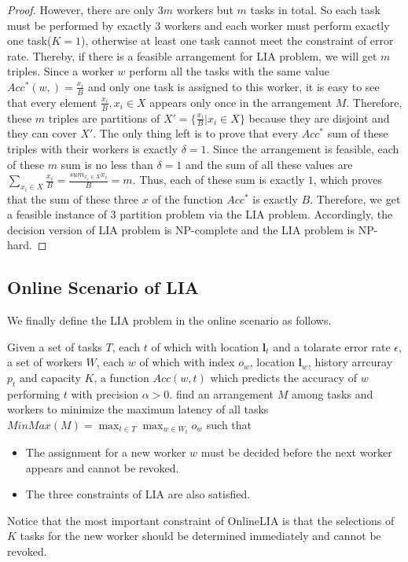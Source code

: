\begin{proof}
However, there are only $3m$ workers but $m$ tasks in total.
So each task must be performed by exactly 3 workers and each worker must perform exactly one task($K = 1$), 
otherwise at least one task cannot meet the constraint of error rate.
Thereby, if there is a feasible arrangement for LIA problem, we will get $m$ triples.
Since a worker $w$ perform all the tasks with the same value $Acc^*(w,) = \frac{x_i}{B}$ and only one task is assigned to this worker, 
it is easy to see that every element $\frac{x_i}{B}, x_i \in X$ appears only once in the arrangement $M$.
Therefore, these $m$ triples are partitions of $X' = \{\frac{x_i}{B} | x_i \in X\}$ because they are disjoint and they can cover $X'$.  
The only thing left is to prove that every $Acc^{*}$ sum of these triples with their workers is exactly $\delta = 1$.
Since the arrangement is feasible, each of these $m$ sum is no less than $\delta = 1$ and the sum of 
all these values are $\sum_{x_i \in X} {\frac{x_i}{B}} = \frac{sum_{x_i \in X} x_i}{B} = m$.
Thus, each of these sum is exactly $1$, which proves that the sum of these three $x$ of the function $Acc^{*}$ is exactly $B$.
Therefore, we get a feasible instance of 3 partition problem via the LIA problem.
Accordingly, the decision version of LIA problem is NP-complete and the LIA problem is NP-hard.
\end{proof}

\subsection{Online Scenario of LIA}

We finally define the LIA problem in the online scenario as follows.
\begin{definition}[OnlineLIA]
Given a set of tasks $T$, each $t$ of which with location $\boldsymbol{l}_t$ and a tolarate error rate $\epsilon$,
a set of workers $W$, each $w$ of which with index $o_w$, location $\boldsymbol{l}_w$, history arrcuray $p_t$ and capacity $K$,
a function $Acc(w, t)$ which predicts the accuracy of $w$ performing $t$ with precision $\alpha > 0$.
find an arrangement $M$ among tasks and workers to minimize the maximum latency of all tasks
$MinMax(M) = \max_{t \in T}{\max_{w \in W_t} o_w}$ such that
\begin{itemize}
\vspace{-1ex}
\item The assignment for a new worker $w$ must be decided before the next worker appears and cannot be revoked.
\vspace{-1ex}
\item The three constraints of LIA are also satisfied.
\end{itemize}
\end{definition}

Notice that the most important constraint of OnlineLIA is that the selections of $K$ tasks for the new worker should be determined immediately and cannot be revoked.
